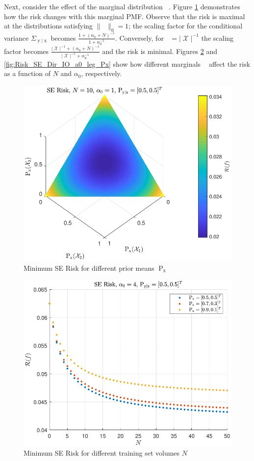 \documentclass[12pt]{report}
\DeclareMathOperator{\xrm}{\mathrm{x}}
\DeclareMathOperator{\yrm}{\mathrm{y}}
\DeclareMathOperator{\Prm}{\mathrm{P}}
\DeclareMathOperator{\Xcal}{\mathcal{X}}
\DeclareMathOperator{\alpham}{\alpha_\text{m}}
\begin{document}
Next, consider the effect of the marginal distribution $\alpham$. Figure \ref{fig:Risk_SE_Dir_IO_Px_N_10_a0_1} demonstrates how the risk changes with this marginal PMF. Observe that the risk is maximal at the distributions satisfying $\| \alpham \|_0 = 1$; the scaling factor for the conditional variance $\Sigma_{\yrm | \xrm}$ becomes $\frac{1 + (\alpha_0+N)^{-1}}{1 + \alpha_0^{-1}}$. Conversely, for $\alpham = |\Xcal|^{-1}$ the scaling factor becomes $\frac{|\Xcal|^{-1} + (\alpha_0+N)^{-1}}{|\Xcal|^{-1} + \alpha_0^{-1}}$ and the risk is minimal. Figures \ref{fig:Risk_SE_Dir_IO_N_leg_Px} and \ref{fig:Risk_SE_Dir_IO_a0_leg_Px} show how different marginals $\alpham$ affect the risk as a function of $N$ and $\alpha_0$, respectively.

\begin{figure}
\centering
\includegraphics[width=0.7\linewidth]{Risk_SE_Dir_IO_Px_N_10_a0_1.pdf}
\caption{Minimum SE Risk for different prior means $\Prm_{\xrm}$}
\label{fig:Risk_SE_Dir_IO_Px_N_10_a0_1}
\end{figure}

\begin{figure}
\centering
\includegraphics[width=0.7\linewidth]{Risk_SE_Dir_IO_N_leg_Px.pdf}
\caption{Minimum SE Risk for different training set volumes $N$}
\label{fig:Risk_SE_Dir_IO_N_leg_Px}
\end{figure}
\end{document}
